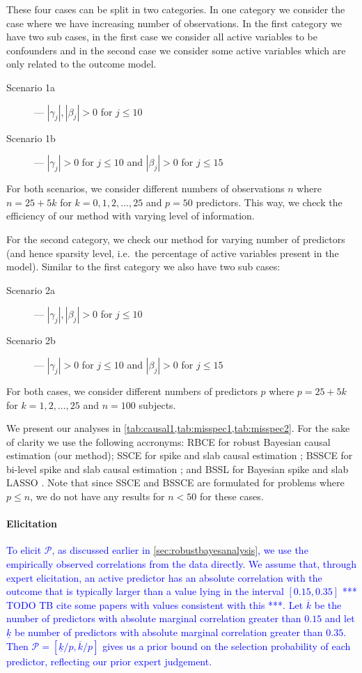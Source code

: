 \documentclass[preprint,12pt]{elsarticle}
\newcommand{\added}[1]{\textcolor{blue}{#1}}
\begin{document}
These four cases can be split in two categories. In one category we consider the
case where we have increasing number of observations. In the first category we have two
sub cases, in the first case we consider all active variables to be confounders
and in the second case we consider some active variables which are only related to
the outcome model. 
\begin{description}
    \item[Scenario 1a] --- $|\gamma_j|, |\beta_j|>0$ for $j\le 10$
    \item[Scenario 1b] --- $|\gamma_j|>0$ for $j\le 10$ and $|\beta_j|>0$ for $j\le 15$
\end{description}
For both
scenarios, we consider different numbers of observations $n$ where
$n=25+ 5k$ for $k=0,1,2,\dots,25$ and $p=50$
predictors. This way, we check the efficiency of our method with varying level of information.

For the second category, we check our method for varying number of predictors 
(and hence sparsity level, i.e.\ the percentage of active variables present in the model).
Similar to the first category we also have two sub cases:
\begin{description}
    \item[Scenario 2a] --- $|\gamma_j|, |\beta_j|>0$ for $j\le 10$
    \item[Scenario 2b] --- $|\gamma_j|>0$ for $j\le 10$ and $|\beta_j|>0$ for $j\le 15$
\end{description}
For both
cases, we consider different numbers of predictors $p$ where
$p=25+ 5k$ for $k=1,2,\dots,25$ and $n=100$
subjects.

We present our analyses in \cref{tab:causal1,tab:misspec1,tab:misspec2}.
For the sake of clarity we use the following accronyms: RBCE for 
robust Bayesian causal estimation (our method); SSCE for spike and
slab causal estimation \citep{koch2020}; BSSCE for bi-level spike and slab causal
estimation \citep{koch2020}; and BSSL for Bayesian spike and slab LASSO
\citep{xu2015}. Note that since SSCE and BSSCE are formulated for problems
where $p\le n$, we do not have any results for $n<50$ for these cases.

\paragraph{Elicitation}

\added{%
To elicit $\mathcal{P}$,
as discussed earlier in \cref{sec:robustbayesanalysis},
we use the empirically observed correlations from the data directly.
We assume that, through expert elicitation,
an active predictor has an absolute correlation with the outcome
that is typically larger than a value lying in the interval $[0.15,0.35]$
*** TODO TB cite some papers with values consistent with this ***.
Let $\overline{k}$ be the number of predictors with absolute marginal correlation greater than $0.15$
and let $\underline{k}$ be number of predictors with absolute marginal correlation greater than $0.35$.
Then $\mathcal{P}=[\underline{k}/p , \overline{k}/p]$ gives us a prior bound on the selection probability of each predictor, reflecting our prior expert judgement.%
}
\end{document}

